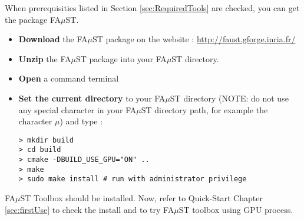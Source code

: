 When prerequisities listed in Section \ref{sec:RequiredTools} are checked, you can get the package FA$\mu$ST.
\begin{itemize}
\item \textbf{Download} the FA$\mu$ST package on the website :  \url{http://faust.gforge.inria.fr/}
\item \textbf{Unzip} the FA$\mu$ST package into your FA$\mu$ST directory.
\item \textbf{Open} a command terminal
\item \textbf{Set the current directory} to your FA$\mu$ST directory (NOTE: do not use any special character in your FA$\mu$ST directory path, for example the character $\mu$) and type :

\lstset{style=customBash}
\begin{lstlisting}
> mkdir build
> cd build
> cmake -DBUILD_USE_GPU="ON" ..
> make
> sudo make install # run with administrator privilege
\end{lstlisting}

\end{itemize}


FA$\mu$ST Toolbox should be installed. Now, refer to Quick-Start Chapter \ref{sec:firstUse} to check the install and to try FA$\mu$ST toolbox using GPU process.

